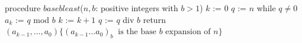 
\begin{algorithm}[caption={Calculating base $b$ expansion, from right}]
procedure $\textit{basebleast}$($n, b$: positive integers with $b > 1$)
$k$ := $0$
$q$ := $n$
while $q  \neq 0$
  $a_{k}$ := $q$ mod $b$
  $k$ := $k+1$
  $q$ := $q$ div $b$
return $(a_{k-1}, \ldots, a_0) \{(a_{k-1} \ldots a_0)_b~\textrm{ is the base } b \textrm{ expansion of } n \}$
\end{algorithm}
